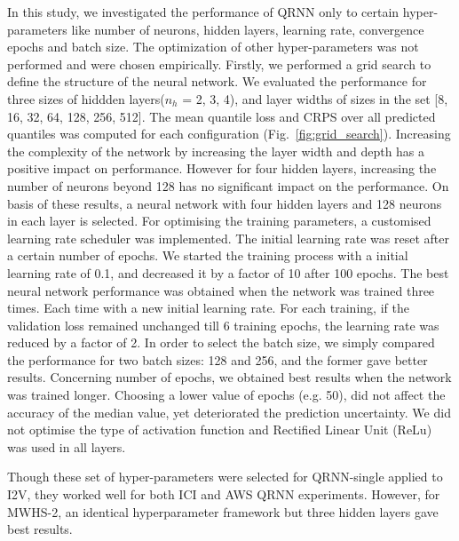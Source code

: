 \documentclass[amt]{copernicus}
\begin{document}
In this study, we investigated the performance of QRNN only to certain hyper-parameters like number of neurons, hidden layers, learning rate, convergence epochs and batch size. The optimization of other hyper-parameters was not performed and were chosen empirically. Firstly, we performed a grid search to define the structure of the neural network. We evaluated the performance for three sizes of hiddden layers($n_h$ = 2, 3, 4), and layer widths of sizes in the set [8, 16, 32, 64, 128, 256, 512]. The mean quantile loss and CRPS over all predicted quantiles was computed for each configuration (Fig.~\ref{fig:grid_search}). Increasing the complexity of the network by increasing the layer width and depth has a positive impact on performance. However for four hidden layers, increasing the number of neurons beyond 128 has no significant impact on the performance. On basis of these results, a neural network with four hidden layers and 128 neurons in each layer is selected. For optimising the training parameters, a customised  learning rate scheduler was implemented. The initial learning rate was reset after a certain number of epochs.  We started the training process with a initial learning rate of 0.1, and decreased it by a factor of 10 after 100 epochs. The best neural network performance was obtained when the network was trained three times. Each time with a new initial learning rate. For each training, if the validation loss remained unchanged till 6 training epochs, the learning rate was reduced by a factor of 2. 
In order to select the batch size, we simply compared the performance for two batch sizes: 128 and 256, and the former gave better results. Concerning number of epochs, we obtained best results when the network was trained longer. Choosing a lower value of epochs (e.g. 50), did not affect the accuracy of the median value, yet deteriorated the prediction uncertainty. We did not optimise the type of activation function and Rectified Linear Unit (ReLu) was used in all layers. 

Though these set of hyper-parameters were selected for QRNN-single applied to I2V, they worked well for both ICI and AWS QRNN experiments. However, for MWHS-2, an identical hyperparameter framework but three hidden layers gave best results.  



\noappendix       %
\end{document}

